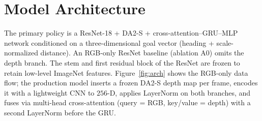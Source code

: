 \documentclass[10pt,twocolumn,letterpaper]{article}
\begin{document}
\section{Model Architecture}
\label{sec:architecture}

The primary policy is a ResNet-18 + DA2-S + cross-attention--GRU--MLP network conditioned on a three-dimensional goal vector (heading + scale-normalized distance). An RGB-only ResNet baseline (ablation A0) omits the depth branch. The stem and first residual block of the ResNet are frozen to retain low-level ImageNet features. Figure~\ref{fig:arch} shows the RGB-only data flow; the production model inserts a frozen DA2-S depth map per frame, encodes it with a lightweight CNN to $256$-D, applies LayerNorm on both branches, and fuses via multi-head cross-attention (query = RGB, key/value = depth) with a second LayerNorm before the GRU.
\end{document}
